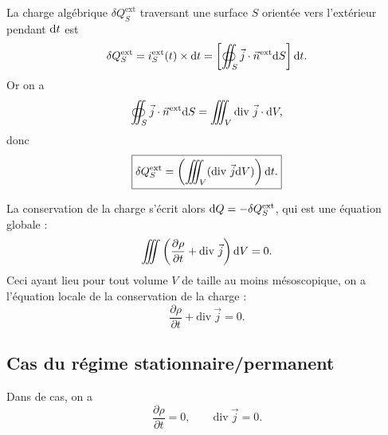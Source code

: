         La charge algébrique $\delta Q_{S}^{\text{ext}}$ traversant une surface $S$ orientée vers l'extérieur pendant $\mathrm{d} t$ est 
        \begin{equation*}
            \delta Q_S^{\text{ext}}=i_{S}^{\text{ext}}(t)\times\mathrm{d} t=\left[
                \oiint_{S}\vec{j}\cdot\vec{n}^{\text{ext}}\mathrm{d} S
            \right]\mathrm{d} t.
        \end{equation*}
        Or on a 
        \begin{equation*}
            \oiint_{S}\vec{j}\cdot\vec{n}^{\text{ext}}\mathrm{d} S=\iiint_{V}\mathrm{div}~\vec{j}\cdot\mathrm{d} V,
        \end{equation*}
        donc
        \begin{equation*}
            \boxed{
                \delta Q_S^{\text{ext}}=\left(
                    \iiint_{V}(\mathrm{div}~\vec{j}\mathrm{d} V)
                \right)\mathrm{d} t.
            }
        \end{equation*}

        La conservation de la charge s'écrit alors $\mathrm{d} Q=-\delta Q_S^{\text{ext}}$, qui est une équation globale :
        \begin{equation*}
            \iiint\left(\frac{\partial\rho}{\partial t}+\mathrm{div}~\vec{j}\right)\mathrm{d} V=0.
        \end{equation*}
        Ceci ayant lieu pour tout volume $V$ de taille au moins mésoscopique, on a l'équation locale de la conservation de la charge :
        \begin{equation*}
            \boxed{
                \frac{\partial\rho}{\partial t}+\mathrm{div}~\vec{j}=0.
            }
        \end{equation*}

    \subsection{Cas du régime stationnaire/permanent}

        Dans de cas, on a 
        \begin{equation*}
            \boxed{
                \dfrac{\partial\rho}{\partial t}=0,\qquad\mathrm{div}~\vec{j}=0.
            }
        \end{equation*}


